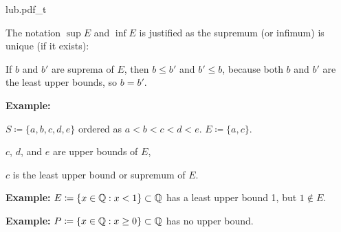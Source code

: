 \documentclass[10pt,aspectratio=149]{beamer}
\begin{document}
\begin{frame}
{lub.pdf_t}

\pause
\medskip

The notation $\sup E$ and $\inf E$ is justified as
the
supremum (or infimum) is unique (if it exists):

\pause
\medskip

If $b$ and
$b'$ are suprema of $E$, then $b \leq b'$ and $b' \leq b$, because both
$b$ and $b'$ are the least upper bounds, so $b=b'$.

\pause
\medskip

\textbf{Example:}

$S \coloneqq \{ a, b, c, d, e \}$ ordered as $a < b < c < d < e$.
\qquad
$E \coloneqq \{ a, c \}$.

\pause

$c$, $d$, and $e$ are upper bounds of $E$,

\pause

$c$ is the least upper bound or supremum of $E$.

\medskip
\pause

\textbf{Example:}
$E \coloneqq \{ x \in {\mathbb{Q}} : x < 1 \} \subset {\mathbb{Q}}$ has a least upper bound 1, but
$1 \notin E$.

\medskip
\pause

\textbf{Example:}
$P \coloneqq \{ x \in {\mathbb{Q}} : x \geq 0 \} \subset {\mathbb{Q}}$ has no upper bound.

\end{frame}
\end{document}
